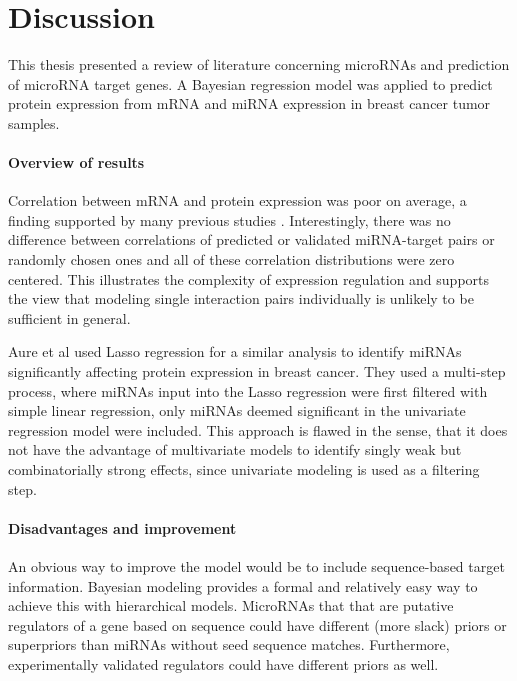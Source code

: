 

\section{Discussion}

This thesis presented a review of literature concerning microRNAs and
prediction of microRNA target genes. A Bayesian regression model was applied
to predict protein expression from mRNA and miRNA expression in breast cancer
tumor samples.

\paragraph{Overview of results}

Correlation between mRNA and protein expression was poor on average, a finding
supported by many previous studies \citep{Payne2015}. Interestingly,
there was no difference between correlations of predicted or validated
miRNA-target pairs or randomly chosen ones and all of these correlation
distributions were zero centered. This illustrates the
complexity of expression regulation and supports the view that modeling
single interaction pairs individually is unlikely to be sufficient in
general.

Aure et al used Lasso regression for a similar analysis
to identify miRNAs significantly
affecting protein expression in breast cancer. They used a multi-step
process, where miRNAs input into the Lasso regression were first
filtered with simple linear regression, only miRNAs deemed significant
in the univariate regression model were included. This approach is
flawed in the sense, that it does not have the advantage of multivariate
models to identify singly weak but combinatorially strong effects, since univariate
modeling is used as a filtering step.

\paragraph{Disadvantages and improvement}

An obvious way to improve the model would be to include sequence-based target
information. Bayesian modeling provides a formal and relatively easy way to
achieve this with hierarchical models. MicroRNAs that that are putative
regulators of a gene based on sequence could have different (more slack)
priors or superpriors than miRNAs without seed sequence matches. Furthermore,
experimentally validated regulators could have different priors as well.

